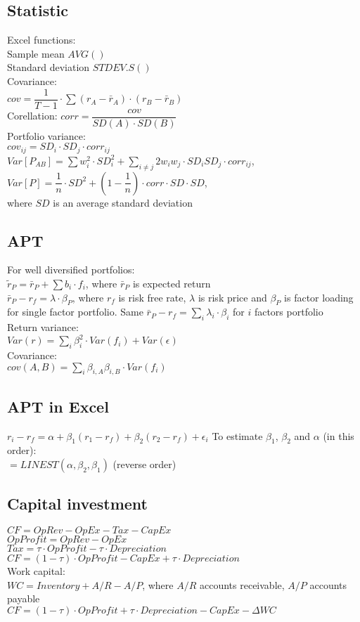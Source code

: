 \subsection*{Statistic}
Excel functions: \\
Sample mean $AVG()$ \\ 
Standard deviation $STDEV.S()$ \\
Covariance: \\ $cov = \dfrac{1}{T-1}\cdot \sum (r_A - \bar{r}_A)\cdot(r_B-\bar{r}_B)$ \\
Corellation: $corr = \dfrac{cov}{SD(A)\cdot SD(B)}$\\
Portfolio variance: \\
$cov_{ij} = SD_i\cdot SD_j \cdot corr_{ij}$\\
$Var[P_{AB}] = \sum w_i^2 \cdot SD_i^2 + \sum_{i\neq j} 2w_iw_j \cdot SD_iSD_j \cdot corr_{ij}$, \\
$Var[P] = \dfrac{1}{n}\cdot SD^2 + \left(1-\dfrac{1}{n}\right)\cdot corr\cdot SD \cdot SD$, \\
where $SD$ is an average standard deviation
\subsection*{APT}
For well diversified portfolios: \\
$\widetilde{r}_P = \bar{r}_P + \sum b_i\cdot f_i$, where $\bar{r}_P$ is expected return\\
$\bar{r}_P - r_f = \lambda\cdot\beta_P$, where $r_f$ is risk free rate, $\lambda$ is risk price and $\beta_P$ is factor loading for single factor portfolio.
Same $\bar{r}_P - r_f = \sum_i \lambda_i\cdot\beta_i$ for $i$ factors portfolio\\
Return variance:\\
$Var(r) = \sum_i \beta_i^2\cdot Var(f_i) + Var(\epsilon)$\\
Covariance: \\
$cov(A,B) = \sum_i\beta_{i,A}\beta_{i,B}\cdot Var(f_i)$
\subsection*{APT in Excel}
$r_i - r_f = \alpha + \beta_1(r_1-r_f) + \beta_2(r_2 - r_f) + \epsilon_i$
To estimate $\beta_1$, $\beta_2$ and $\alpha$ (in this order): \\
$=LINEST(\alpha, \beta_2, \beta_1)$ (reverse order)
\subsection*{Capital investment}
$CF = OpRev - OpEx - Tax - CapEx$\\
$OpProfit = OpRev - OpEx$ \\
$Tax = \tau\cdot OpProfit - \tau\cdot Depreciation$ \\
$CF = (1-\tau)\cdot OpProfit - CapEx + \tau \cdot Depreciation$ \\
Work capital:\\
$WC = Inventory + A/R - A/P$, where $A/R$ accounts receivable, $A/P$ accounts payable\\
$CF = (1-\tau)\cdot OpProfit + \tau\cdot Depreciation - CapEx - \Delta WC$
